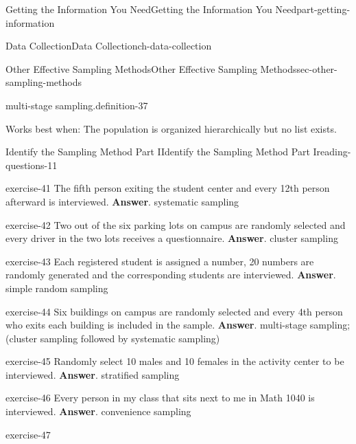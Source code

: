 \documentclass[oneside,10pt,]{book}
\numberwithin{equation}{section}
\begin{document}
\begin{partptx}{Getting the Information You Need}{}{Getting the Information You Need}{}{}{part-getting-information}
\begin{chapterptx}{Data Collection}{}{Data Collection}{}{}{ch-data-collection}
\begin{sectionptx}{Other Effective Sampling Methods}{}{Other Effective Sampling Methods}{}{}{sec-other-sampling-methods}
\begin{definition}{multi-stage sampling.}{definition-37}
\par
\hypertarget{p-29}{}%
Works best when: The population is organized hierarchically but no list exists.%
\end{definition}
%
%
\typeout{************************************************}
\typeout{************************************************}
%
\begin{reading-questions-subsection-numberless}{Identify the Sampling Method Part I}{}{Identify the Sampling Method Part I}{}{}{reading-questions-11}
\begin{divisionexercise}{1}{}{}{exercise-41}%
The fifth person exiting the student center and every 12th person afterward is interviewed. \textbf{Answer}.\hypertarget{answer-42}{}\quad%
systematic sampling\end{divisionexercise}%
\begin{divisionexercise}{2}{}{}{exercise-42}%
Two out of the six parking lots on campus are randomly selected and every driver in the two lots receives a questionnaire. \textbf{Answer}.\hypertarget{answer-43}{}\quad%
cluster sampling\end{divisionexercise}%
\begin{divisionexercise}{3}{}{}{exercise-43}%
Each registered student is assigned a number, 20 numbers are randomly generated and the corresponding students are interviewed. \textbf{Answer}.\hypertarget{answer-44}{}\quad%
simple random sampling\end{divisionexercise}%
\begin{divisionexercise}{4}{}{}{exercise-44}%
Six buildings on campus are randomly selected and every 4th person who exits each building is included in the sample. \textbf{Answer}.\hypertarget{answer-45}{}\quad%
multi-stage sampling; (cluster sampling followed by systematic sampling)\end{divisionexercise}%
\begin{divisionexercise}{5}{}{}{exercise-45}%
Randomly select 10 males and 10 females in the activity center to be interviewed. \textbf{Answer}.\hypertarget{answer-46}{}\quad%
stratified sampling\end{divisionexercise}%
\begin{divisionexercise}{6}{}{}{exercise-46}%
Every person in my class that sits next to me in Math 1040 is interviewed. \textbf{Answer}.\hypertarget{answer-47}{}\quad%
convenience sampling\end{divisionexercise}%
\begin{divisionexercise}{7}{}{}{exercise-47}%

\end{divisionexercise}
\end{reading-questions-subsection-numberless}
\end{sectionptx}
\end{chapterptx}
\end{partptx}
\end{document}
